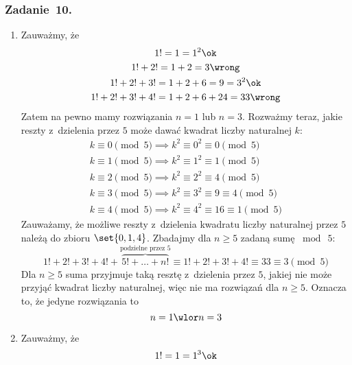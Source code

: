 \subsubsection*{Zadanie~10.}
\begin{enumerate}[label={\alph*)}]
    \item Zauważmy, że
        \begin{gather*}
            1! = 1 = 1^2 \ok\\
            1! + 2! = 1 + 2 = 3 \wrong\\
            1! + 2! + 3! = 1 + 2 + 6 = 9 = 3^2 \ok\\
            1! + 2! + 3! + 4! = 1 + 2 + 6 + 24 = 33 \wrong
        \end{gather*}
        Zatem na pewno mamy rozwiązania \(n = 1\) lub \(n = 3\). Rozważmy teraz, jakie reszty z~dzielenia przez \(5\) może dawać kwadrat liczby naturalnej \(k\):
        \begin{gather*}
            k \equiv 0 \pmod{5} \implies k^2 \equiv 0^2 \equiv 0 \pmod{5}\\
            k \equiv 1 \pmod{5} \implies k^2 \equiv 1^2 \equiv 1 \pmod{5}\\
            k \equiv 2 \pmod{5} \implies k^2 \equiv 2^2 \equiv 4 \pmod{5}\\
            k \equiv 3 \pmod{5} \implies k^2 \equiv 3^2 \equiv 9 \equiv 4 \pmod{5}\\
            k \equiv 4 \pmod{5} \implies k^2 \equiv 4^2 \equiv 16 \equiv 1 \pmod{5}
        \end{gather*}
        Zauważamy, że możliwe reszty z~dzielenia kwadratu liczby naturalnej przez \(5\) należą do zbioru \(\set{0, 1, 4}\). Zbadajmy dla \(n \geq 5\) zadaną sumę \(\bmod\ 5\):
        \begin{equation*}
            1! + 2! + 3! + 4! + \overbrace{5! + \ldots + n!}^{\text{podzielne przez } 5} \equiv 1! + 2! + 3! + 4! \equiv 33 \equiv 3 \pmod{5}
        \end{equation*}
        Dla \(n \geq 5\) suma przyjmuje taką resztę z~dzielenia przez \(5\), jakiej nie może przyjąć kwadrat liczby naturalnej, więc nie ma rozwiązań dla \(n \geq 5\). Oznacza to, że jedyne rozwiązania to
        \begin{equation*}
            n = 1 \wlor n = 3
        \end{equation*}
    \item Zauważmy, że
        \begin{gather*}
            1! = 1 = 1^3 \ok\\

\end{gather*}
\end{enumerate}

